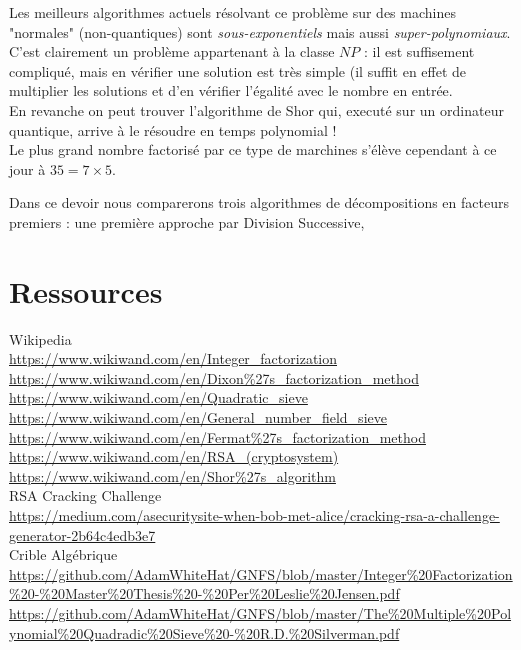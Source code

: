         Les meilleurs algorithmes actuels résolvant ce problème sur des machines "normales" (non-quantiques) sont \textit{sous-exponentiels} mais  aussi \textit{super-polynomiaux}. C'est clairement un problème appartenant à la classe $NP$ : il est suffisement compliqué, mais en vérifier une solution est très simple (il suffit en effet de multiplier les solutions et d'en vérifier l'égalité avec le nombre en entrée.\\
        En revanche on peut trouver l'algorithme de Shor qui, executé sur un ordinateur quantique, arrive à le résoudre en temps polynomial !\\
        Le plus grand nombre factorisé par ce type de marchines s'élève cependant à ce jour à $35 = 7 \times 5$.
        
        Dans ce devoir nous comparerons trois algorithmes de décompositions en facteurs premiers : une première approche par Division Successive, 


    \vspace{1cm}
    \tableofcontents
    
    

    



    




    
    
\section{Ressources}%

Wikipedia\\
\url{https://www.wikiwand.com/en/Integer_factorization}\\
\url{https://www.wikiwand.com/en/Dixon%27s_factorization_method}\\
\url{https://www.wikiwand.com/en/Quadratic_sieve}\\
\url{https://www.wikiwand.com/en/General_number_field_sieve}\\
\url{https://www.wikiwand.com/en/Fermat%27s_factorization_method}\\
\url{https://www.wikiwand.com/en/RSA_(cryptosystem)}\\
\url{https://www.wikiwand.com/en/Shor%27s_algorithm}\\

RSA Cracking Challenge\\
\url{https://medium.com/asecuritysite-when-bob-met-alice/cracking-rsa-a-challenge-generator-2b64c4edb3e7}\\

Crible Algébrique\\
\url{https://github.com/AdamWhiteHat/GNFS/blob/master/Integer%20Factorization%20-%20Master%20Thesis%20-%20Per%20Leslie%20Jensen.pdf}\\
\url{https://github.com/AdamWhiteHat/GNFS/blob/master/The%20Multiple%20Polynomial%20Quadradic%20Sieve%20-%20R.D.%20Silverman.pdf}


